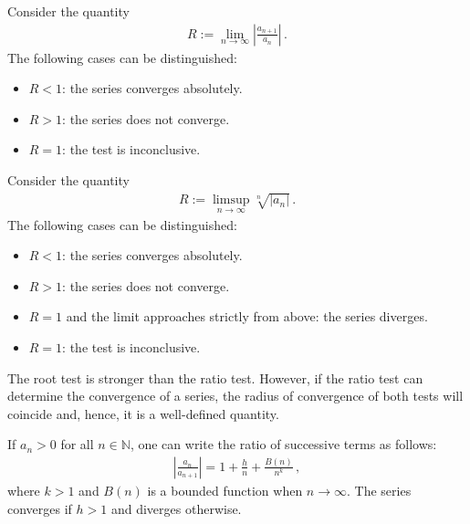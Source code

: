     \begin{method}
        Consider the quantity
        \begin{gather}
            R := \lim_{n\rightarrow\infty}\left|\frac{a_{n+1}}{a_n}\right|\,.
        \end{gather}
        The following cases can be distinguished:
        \begin{itemize}
            \item $R<1$: the series converges absolutely.
            \item $R>1$: the series does not converge.
            \item $R=1$: the test is inconclusive.
        \end{itemize}
    \end{method}

    \begin{method}
        Consider the quantity
        \begin{gather}
            R := \limsup_{n\rightarrow\infty}\sqrt[n]{|a_n|}\,.
        \end{gather}
        The following cases can be distinguished:
        \begin{itemize}
            \item $R<1$: the series converges absolutely.
            \item $R>1$: the series does not converge.
            \item $R=1$ and the limit approaches strictly from above: the series diverges.
            \item $R=1$: the test is inconclusive.
        \end{itemize}
    \end{method}
    \begin{remark}
        The root test is stronger than the ratio test. However, if the ratio test can determine the convergence of a series, the radius of convergence of both tests will coincide and, hence, it is a well-defined quantity.
    \end{remark}

    \begin{method}\label{series:gauss_test}
        If $a_n>0$ for all $n\in\mathbb{N}$, one can write the ratio of successive terms as follows:
        \begin{gather}
            \left|\frac{a_n}{a_{n+1}}\right| = 1 + \frac{h}{n} + \frac{B(n)}{n^k}\,,
        \end{gather}
        where $k>1$ and $B(n)$ is a bounded function when $n\longrightarrow\infty$. The series converges if $h>1$ and diverges otherwise.
    \end{method}

